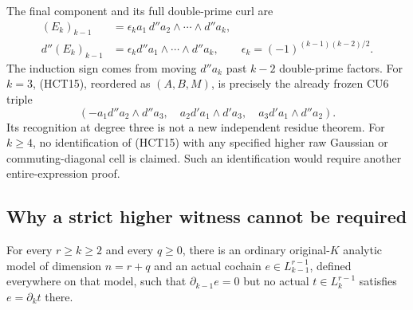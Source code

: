 The final component and its full double-prime curl are
\[
 \begin{split}
 (E_k)_{k-1}
   &=\epsilon_k a_1\,d''a_2\wedge\cdots\wedge d''a_k,\\
 d''(E_k)_{k-1}
   &=\epsilon_k d''a_1\wedge\cdots\wedge d''a_k,
 \qquad \epsilon_k=(-1)^{(k-1)(k-2)/2}.
 \end{split}
 \tag{HCT17}
\]
The induction sign comes from moving $d''a_k$ past $k-2$
double-prime factors.  For $k=3$, (HCT15), reordered as $(A,B,M)$,
is precisely the already frozen CU6 triple
\[
 (-a_1d''a_2\wedge d''a_3,\quad
   a_2d'a_1\wedge d'a_3,\quad a_3d'a_1\wedge d''a_2).
 \tag{HCT18}
\]
Its recognition at degree three is not a new independent residue
theorem.  For $k\ge4$, no identification of (HCT15) with any
specified higher raw Gaussian or commuting-diagonal cell is claimed.
Such an identification would require another entire-expression proof.

\subsection{Why a strict higher witness cannot be required}

\begin{proposition}
For every $r\ge k\ge2$ and every $q\ge0$, there is an ordinary
original-$K$ analytic model of dimension $n=r+q$ and an actual
cochain $e\in L_{k-1}^{r-1}$, defined everywhere on that model,
such that $\partial_{k-1}e=0$ but no actual $t\in L_k^{r-1}$
satisfies $e=\partial_k t$ there.
\end{proposition}

